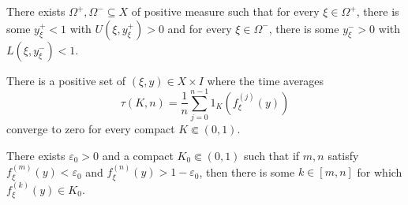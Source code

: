 \documentclass[b5paper]{memoir}
\begin{document}

    
  

\begin{hypothesis}
  There exists \(\Omega^+, \Omega^- \subseteq X\) of positive measure such that for every \(\xi \in \Omega^+\), there is some \(y_{\xi}^+ < 1\) with \(U(\xi,y_{\xi}^+) > 0\) and for every \(\xi \in \Omega^-\), there is some \(y_{\xi}^- > 0\) with \(L(\xi,y_{\xi}^-) < 1\).
\end{hypothesis}

\begin{hypothesis}
  There is a positive set of \((\xi,y) \in X \times I\) where the time averages
  \begin{equation*}
    \tau(K,n) = \frac{1}{n}\sum_{j = 0}^{n - 1} 1_K(f_{\xi}^{(j)}(y))
  \end{equation*}
  converge to zero for every compact \(K \Subset (0,1)\).
\end{hypothesis}

\begin{hypothesis}\label{h:bounded}
  There exists \(\varepsilon_0 > 0\) and a compact \(K_0 \Subset (0,1)\) such that if \(m,n\) satisfy \(f_{\xi}^{(m)}(y) < \varepsilon_0\) and \(f_{\xi}^{(n)}(y) > 1 - \varepsilon_0\), then there is some \(k \in [m,n]\) for which \(f_{\xi}^{(k)}(y) \in K_0\). 

\end{hypothesis}
\end{document}
